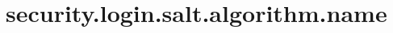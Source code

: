 \section{security.login.salt.algorithm.name}
\label{configuration:SecurityLoginSaltAlgorithmName}
\TODO
